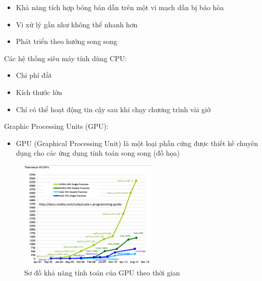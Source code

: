\documentclass[14pt, a4paper]{article}
\numberwithin{equation}{section}
\numberwithin{figure}{section}
\numberwithin{dl}{section}
\numberwithin{md}{section}
\numberwithin{bd}{section}
\numberwithin{dn}{section}
\numberwithin{hq}{section}
\begin{document}
\begin{itemize}
    \item Khả năng tích hợp bóng bán dẫn trên một vi mạch dần bị bão hòa
    \item Vi xử lý gần như không thể nhanh hơn
    \item Phát triển theo hướng song song
\end{itemize}

Các hệ thống siêu máy tính dùng CPU:

\begin{itemize}
    \item Chi phí đắt
    \item Kích thước lớn
    \item Chỉ có thể hoạt động tin cậy sau khi chạy chương trình vài giờ
\end{itemize}

Graphic Processing Units (GPU):

\begin{itemize}
    \item GPU (Graphical Processing Unit) là một loại phần cứng được thiết kế chuyên dụng cho các ứng dụng tính toán song song (đồ họa)
\end{itemize}
\begin{figure}[H]
    \centering
    \includegraphics[width=0.6\textwidth]{figures/CUDA/GFLOP_Trend.png}
    \caption{Sơ đồ khả năng tính toán của GPU theo thời gian}
\end{figure}
\end{document}
